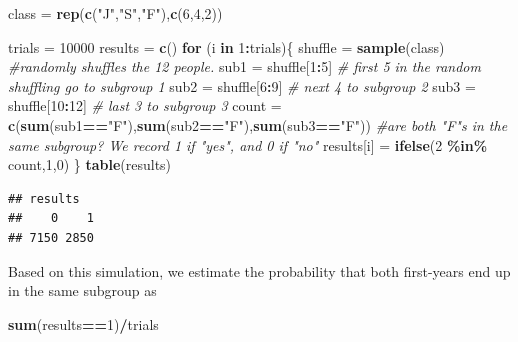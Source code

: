 \documentclass[
]{book}
\newenvironment{Shaded}{\begin{snugshade}}{\end{snugshade}}
\newcommand{\CommentTok}[1]{\textcolor[rgb]{0.56,0.35,0.01}{\textit{#1}}}
\newcommand{\ControlFlowTok}[1]{\textcolor[rgb]{0.13,0.29,0.53}{\textbf{#1}}}
\newcommand{\DecValTok}[1]{\textcolor[rgb]{0.00,0.00,0.81}{#1}}
\newcommand{\FunctionTok}[1]{\textcolor[rgb]{0.13,0.29,0.53}{\textbf{#1}}}
\newcommand{\NormalTok}[1]{#1}
\newcommand{\OtherTok}[1]{\textcolor[rgb]{0.56,0.35,0.01}{#1}}
\newcommand{\SpecialCharTok}[1]{\textcolor[rgb]{0.81,0.36,0.00}{\textbf{#1}}}
\newcommand{\StringTok}[1]{\textcolor[rgb]{0.31,0.60,0.02}{#1}}
\theoremstyle{definition}
\theoremstyle{definition}
\theoremstyle{definition}
\theoremstyle{definition}
\theoremstyle{remark}
\begin{document}
\begin{Shaded}
\begin{Highlighting}[]
\NormalTok{class }\OtherTok{=} \FunctionTok{rep}\NormalTok{(}\FunctionTok{c}\NormalTok{(}\StringTok{"J"}\NormalTok{,}\StringTok{"S"}\NormalTok{,}\StringTok{"F"}\NormalTok{),}\FunctionTok{c}\NormalTok{(}\DecValTok{6}\NormalTok{,}\DecValTok{4}\NormalTok{,}\DecValTok{2}\NormalTok{))}

\NormalTok{trials }\OtherTok{=} \DecValTok{10000}
\NormalTok{results }\OtherTok{=} \FunctionTok{c}\NormalTok{()}
\ControlFlowTok{for}\NormalTok{ (i }\ControlFlowTok{in} \DecValTok{1}\SpecialCharTok{:}\NormalTok{trials)\{}
\NormalTok{  shuffle }\OtherTok{=} \FunctionTok{sample}\NormalTok{(class) }\CommentTok{\#randomly shuffles the 12 people.}
\NormalTok{  sub1 }\OtherTok{=}\NormalTok{ shuffle[}\DecValTok{1}\SpecialCharTok{:}\DecValTok{5}\NormalTok{]  }\CommentTok{\# first 5 in the random shuffling go to subgroup 1}
\NormalTok{  sub2 }\OtherTok{=}\NormalTok{ shuffle[}\DecValTok{6}\SpecialCharTok{:}\DecValTok{9}\NormalTok{] }\CommentTok{\# next 4 to subgroup 2}
\NormalTok{  sub3 }\OtherTok{=}\NormalTok{ shuffle[}\DecValTok{10}\SpecialCharTok{:}\DecValTok{12}\NormalTok{] }\CommentTok{\# last 3 to subgroup 3}
\NormalTok{  count }\OtherTok{=} \FunctionTok{c}\NormalTok{(}\FunctionTok{sum}\NormalTok{(sub1}\SpecialCharTok{==}\StringTok{"F"}\NormalTok{),}\FunctionTok{sum}\NormalTok{(sub2}\SpecialCharTok{==}\StringTok{"F"}\NormalTok{),}\FunctionTok{sum}\NormalTok{(sub3}\SpecialCharTok{==}\StringTok{"F"}\NormalTok{))}
  \CommentTok{\#are both "F"s in the same subgroup? We record 1 if "yes", and 0 if "no"}
\NormalTok{  results[i] }\OtherTok{=} \FunctionTok{ifelse}\NormalTok{(}\DecValTok{2} \SpecialCharTok{\%in\%}\NormalTok{ count,}\DecValTok{1}\NormalTok{,}\DecValTok{0}\NormalTok{)}
\NormalTok{\}}
\FunctionTok{table}\NormalTok{(results)}
\end{Highlighting}
\end{Shaded}

\begin{verbatim}
## results
##    0    1 
## 7150 2850
\end{verbatim}

Based on this simulation, we estimate the probability that both first-years end up in the same subgroup as

\begin{Shaded}
\begin{Highlighting}[]
\FunctionTok{sum}\NormalTok{(results}\SpecialCharTok{==}\DecValTok{1}\NormalTok{)}\SpecialCharTok{/}\NormalTok{trials}
\end{Highlighting}
\end{Shaded}
\end{document}

